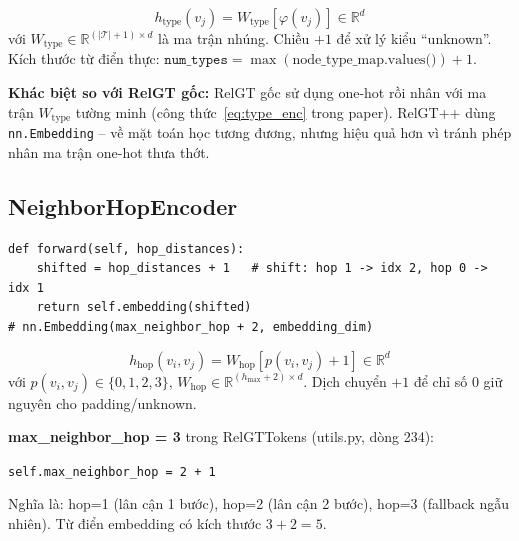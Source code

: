 \documentclass[12pt,a4paper]{article}
\begin{document}
\begin{mathbox}[title={Công thức toán học}]
\begin{equation}
  h_\text{type}(v_j) = W_\text{type}[\varphi(v_j)] \in \mathbb{R}^d
  \label{eq:type_enc}
\end{equation}
với $W_\text{type} \in \mathbb{R}^{(|\mathcal{T}|+1) \times d}$ là ma trận nhúng.
Chiều $+1$ để xử lý kiểu ``unknown''. Kích thước từ điển thực:
$\texttt{num\_types} = \max(\text{node\_type\_map.values()}) + 1$.
\end{mathbox}

\begin{insightbox}
\textbf{Khác biệt so với RelGT gốc:} RelGT gốc sử dụng one-hot rồi nhân với ma trận
$W_\text{type}$ tường minh (công thức~\ref{eq:type_enc} trong paper). RelGT++ dùng
\texttt{nn.Embedding} -- về mặt toán học tương đương, nhưng hiệu quả hơn vì tránh
phép nhân ma trận one-hot thưa thớt.
\end{insightbox}

\subsection{NeighborHopEncoder}

\begin{codebox}[title={encoders.py -- NeighborHopEncoder.forward()}]
\begin{lstlisting}
def forward(self, hop_distances):
    shifted = hop_distances + 1   # shift: hop 1 -> idx 2, hop 0 -> idx 1
    return self.embedding(shifted)
# nn.Embedding(max_neighbor_hop + 2, embedding_dim)
\end{lstlisting}
\end{codebox}

\begin{mathbox}[title={Công thức toán học}]
\begin{equation}
  h_\text{hop}(v_i, v_j) = W_\text{hop}[p(v_i,v_j) + 1] \in \mathbb{R}^d
\end{equation}
với $p(v_i,v_j) \in \{0,1,2,3\}$, $W_\text{hop} \in \mathbb{R}^{(h_\text{max}+2)\times d}$.
Dịch chuyển $+1$ để chỉ số 0 giữ nguyên cho padding/unknown.
\end{mathbox}

\begin{designbox}
\textbf{max\_neighbor\_hop = 3} trong RelGTTokens (utils.py, dòng 234):
\begin{center}
\texttt{self.max\_neighbor\_hop = 2 + 1}
\end{center}
Nghĩa là: hop=1 (lân cận 1 bước), hop=2 (lân cận 2 bước), hop=3 (fallback ngẫu nhiên).
Từ điển embedding có kích thước $3+2=5$.
\end{designbox}
\end{document}
